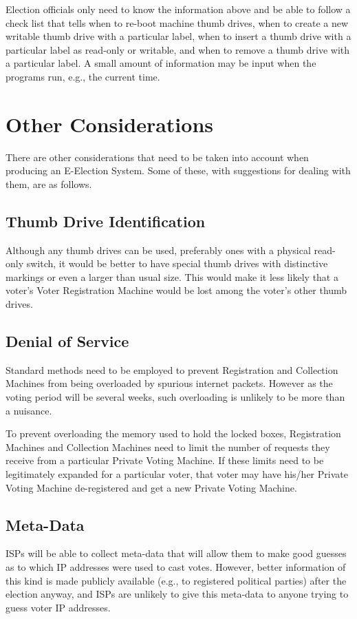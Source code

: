 \documentclass[12pt]{article}
\begin{document}
Election officials only need to know the information above
and be able to follow a check list that tells
when to re-boot machine thumb drives,
when to create a new writable thumb drive with a particular
label,
when to insert a thumb drive with a particular label
as read-only or writable, and
when to remove a thumb drive with a particular label.
A small amount of information may be input when the programs run,
e.g., the current time.


\section{Other Considerations}

There are other considerations that need to be taken into
account when producing an E-Election System.  Some of these,
with suggestions for dealing with them, are as follows.

\subsection{Thumb Drive Identification}

Although any thumb drives can be used, preferably ones with
a physical read-only switch, it would be better to
have special thumb drives with distinctive markings or even
a larger than usual size.  This would make it less likely
that a voter's Voter Registration Machine would be lost
among the voter's other thumb drives.

\subsection{Denial of Service}

Standard methods need to be employed to prevent Registration and
Collection Machines from being overloaded by spurious internet packets.
However as the voting period will be several weeks, such
overloading is unlikely to be more than a nuisance.

To prevent overloading the memory used to hold the locked boxes,
Registration Machines and Collection Machines need to limit the
number of requests they receive from a particular Private Voting Machine.
If these limits need to be legitimately expanded for a particular
voter, that voter may have his/her Private Voting Machine de-registered
and get a new Private Voting Machine.

\subsection{Meta-Data}

ISPs will be able to collect meta-data that will allow them to
make good guesses as to which IP addresses were used to cast votes.
However, better information of this kind is made publicly available
(e.g., to registered political parties) after the election anyway,
and ISPs are unlikely to give this meta-data to anyone trying to
guess voter IP addresses.
\end{document}
